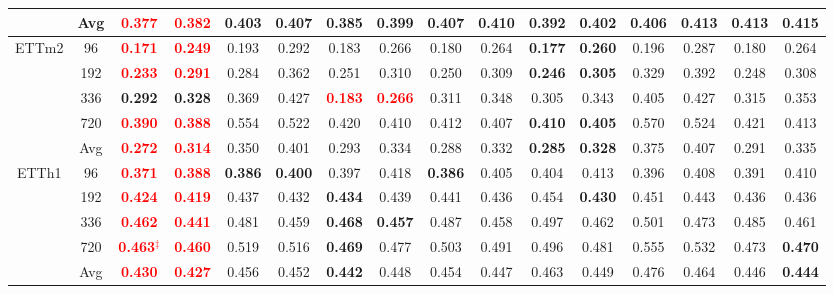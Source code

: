 \documentclass[a4paper,fleqn]{cas-sc}
\begin{document}
\begin{table}[t]
{\begin{tabular}{c|c|cc|cc|cc|cc|cc|cc|cc}
& Avg & \textbf{\textcolor{red}{0.377}} & \textbf{\textcolor{red}{0.382}} & 0.403 & 0.407 & \textbf{0.385} & \textbf{0.399} & 0.407 & 0.410 & 0.392 & 0.402 & 0.406 & 0.413 & 0.413 & 0.415 \\
\midrule
\multirow{5}{*}{ETTm2}
& 96 & \textbf{\textcolor{red}{0.171}} & \textbf{\textcolor{red}{0.249}} & 0.193 & 0.292 & 0.183 & 0.266 & 0.180 & 0.264 & \textbf{0.177} & \textbf{0.260} & 0.196 & 0.287 & 0.180 & 0.264 \\
& 192 & \textbf{\textcolor{red}{0.233}} & \textbf{\textcolor{red}{0.291}} & 0.284 & 0.362 & 0.251 & 0.310 & 0.250 & 0.309 & \textbf{0.246} & \textbf{0.305} & 0.329 & 0.392 & 0.248 & 0.308 \\
& 336 & \textbf{0.292} & \textbf{0.328} & 0.369 & 0.427 & \textbf{\textcolor{red}{0.183}} & \textbf{\textcolor{red}{0.266}} & 0.311 & 0.348 & 0.305 & 0.343 & 0.405 & 0.427 & 0.315 & 0.353 \\
& 720 & \textbf{\textcolor{red}{0.390}} & \textbf{\textcolor{red}{0.388}} & 0.554 & 0.522 & 0.420 & 0.410 & 0.412 & 0.407 & \textbf{0.410} & \textbf{0.405} & 0.570 & 0.524 & 0.421 & 0.413 \\
& Avg & \textbf{\textcolor{red}{0.272}} & \textbf{\textcolor{red}{0.314}} & 0.350 & 0.401 & 0.293 & 0.334 & 0.288 & 0.332 & \textbf{0.285} & \textbf{0.328} & 0.375 & 0.407 & 0.291 & 0.335 \\
\midrule
\multirow{5}{*}{ETTh1}
& 96 & \textbf{\textcolor{red}{0.371}} & \textbf{\textcolor{red}{0.388}} & \textbf{0.386} & \textbf{0.400} & 0.397 & 0.418 & \textbf{0.386} & 0.405 & 0.404 & 0.413 & 0.396 & 0.408 & 0.391 & 0.410 \\
& 192 & \textbf{\textcolor{red}{0.424}} & \textbf{\textcolor{red}{0.419}} & 0.437 & 0.432 & \textbf{0.434} & 0.439 & 0.441 & 0.436 & 0.454 & \textbf{0.430} & 0.451 & 0.443 & 0.436 & 0.436 \\
& 336 & \textbf{\textcolor{red}{0.462}} & \textbf{\textcolor{red}{0.441}} & 0.481 & 0.459 & \textbf{0.468} & \textbf{0.457} & 0.487 & 0.458 & 0.497 & 0.462 & 0.501 & 0.473 & 0.485 & 0.461 \\
& 720 & \textbf{\textcolor{red}{0.463$^\ddagger$}} & \textbf{\textcolor{red}{0.460}} & 0.519 & 0.516 & \textbf{0.469} & 0.477 & 0.503 & 0.491 & 0.496 & 0.481 & 0.555 & 0.532 & 0.473 & \textbf{0.470} \\
& Avg & \textbf{\textcolor{red}{0.430}} & \textbf{\textcolor{red}{0.427}} & 0.456 & 0.452 & \textbf{0.442} & 0.448 & 0.454 & 0.447 & 0.463 & 0.449 & 0.476 & 0.464 & 0.446 & \textbf{0.444} \\

\end{tabular}}
\end{table}
\end{document}

